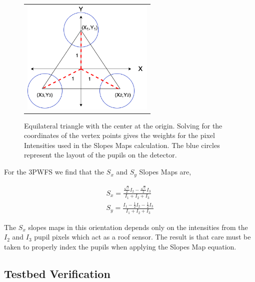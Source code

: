 
\begin{figure}
\begin{center}
\begin{tabular}{c}
\includegraphics[height=5.5cm]{Chapter Materials/Chapter Two Materials/3PWFSslopesMap.png}
\end{tabular}
\end{center}
\caption 
{ \label{fig:triCentFig}
Equilateral triangle with the center at the origin. Solving for the coordinates of the vertex points gives the weights for the pixel Intensities used in the Slopes Maps calculation. The blue circles represent the layout of the pupils on the detector. } 
\end{figure} 

For the 3PWFS we find that the $S_x$ and $S_y$ Slopes Maps are,

\begin{eqnarray}
    S_x=\frac{\frac{\sqrt{3}}{2}I_2-\frac{\sqrt{3}}{2}I_3}{I_1+I_2+I_3} \label{3PWFSslopes} \\
    S_y=\frac{I_1-\frac{1}{2}I_2-\frac{1}{2}I_3}{I_1+I_2+I_3} \nonumber
\end{eqnarray}

The $S_x$ slopes maps in this orientation depends only on the intensities from the $I_2$ and $I_3$ pupil pixels which act as a roof sensor. The result is that care must be taken to properly index the pupils when applying the Slopes Map equation. 
 
\subsection{Testbed Verification}
 
